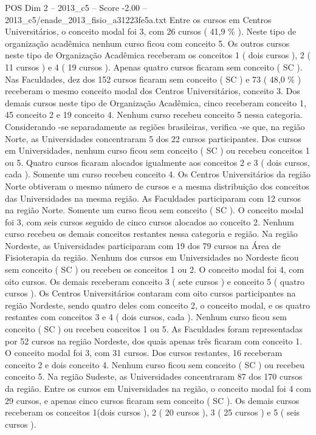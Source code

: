 \begin{textsample}{POS Dim 2 – 2013\_c5 – Score -2.00 – 2013\_c5/enade\_2013\_fisio\_a31223fe5a.txt}
Entre os cursos em Centros Universitários, o conceito modal foi 3, com 26 cursos ( 41,9 \% ).
Neste tipo de organização acadêmica nenhum curso ficou com conceito 5.
Os outros cursos neste tipo de Organização Acadêmica receberam os conceitos 1 ( dois cursos ), 2 ( 11 cursos ) e 4 ( 19 cursos ).
Apenas quatro cursos ficaram sem conceito ( SC ).
Nas Faculdades, dez dos 152 cursos ficaram sem conceito ( SC ) e 73 ( 48,0 \% ) receberam o mesmo conceito modal dos Centros Universitários, conceito 3.
Dos demais cursos neste tipo de Organização Acadêmica, cinco receberam conceito 1, 45 conceito 2 e 19 conceito 4.
Nenhum curso recebeu conceito 5 nessa categoria.
Considerando -se separadamente as regiões brasileiras, verifica -se que, na região Norte, as Universidades concentraram 5 dos 22 cursos participantes.
Dos cursos em Universidades, nenhum curso ficou sem conceito ( SC ) ou recebeu conceitos 1 ou 5.
Quatro cursos ficaram alocados igualmente aos conceitos 2 e 3 ( dois cursos, cada ).
Somente um curso recebeu conceito 4.
Os Centros Universitários da região Norte obtiveram o mesmo número de cursos e a mesma distribuição dos conceitos das Universidades na mesma região.
As Faculdades participaram com 12 cursos na região Norte.
Somente um curso ficou sem conceito ( SC ).
O conceito modal foi 3, com seis cursos seguido de cinco cursos alocados ao conceito 2.
Nenhum curso recebeu os demais conceitos restantes nessa categoria e região.
Na região Nordeste, as Universidades participaram com 19 dos 79 cursos na Área de Fisioterapia da região.
Nenhum dos cursos em Universidades no Nordeste ficou sem conceito ( SC ) ou recebeu os conceitos 1 ou 2.
O conceito modal foi 4, com oito cursos.
Os demais receberam conceito 3 ( sete cursos ) e conceito 5 ( quatro cursos ).
Os Centros Universitários contaram com oito cursos participantes na região Nordeste, sendo quatro deles com conceito 2, o conceito modal, e os quatro restantes com conceitos 3 e 4 ( dois cursos, cada ).
Nenhum curso ficou sem conceito ( SC ) ou recebeu conceitos 1 ou 5.
As Faculdades foram representadas por 52 cursos na região Nordeste, dos quais apenas três ficaram com conceito 1.
O conceito modal foi 3, com 31 cursos.
Dos cursos restantes, 16 receberam conceito 2 e dois conceito 4.
Nenhum curso ficou sem conceito ( SC ) ou recebeu conceito 5.
Na região Sudeste, as Universidades concentraram 87 dos 170 cursos da região.
Entre os cursos em Universidades na região, o conceito modal foi 4 com 29 cursos, e apenas cinco cursos ficaram sem conceito ( SC ).
Os demais cursos receberam os conceitos 1(dois cursos ), 2 ( 20 cursos ), 3 ( 25 cursos ) e 5 ( seis cursos ).

\end{textsample}

